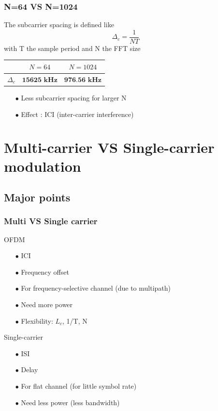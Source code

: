 \documentclass[11pt]{beamer}
\begin{document}
\begin{frame}
\frametitle{N=64 VS N=1024}
The subcarrier spacing is defined like
\begin{equation}
\Delta_c=\frac{1}{NT} 
\end{equation}
with T the sample period and N the FFT size

\begin{center}
	\begin{tabular}{c|c|c}
		  & $N=64$ & $N=1024$\\
		  \hline
	$\Delta_c$ & $\textbf{15625~kHz}$ & $\textbf{976.56 kHz}$ \\
	\end{tabular}
	\label{tab3}
\end{center}

\begin{itemize}

\item[$\bullet$] Less subcarrier spacing for larger N
\item[$\bullet$] Effect : ICI (inter-carrier interference)
\end{itemize}

\end{frame}

\section{Multi-carrier VS Single-carrier modulation}

\subsection{Major points}
\begin{frame}
\frametitle{Multi VS Single carrier}
\begin{minipage}[t]{0.48\linewidth}
OFDM
\begin{itemize}
\item[$\bullet$] {\color{red} ICI}
\item[$\bullet$] {\color{red} Frequency offset}
\item[$\bullet$] For frequency-selective channel (due to multipath)
\item[$\bullet$] Need more power
\item[$\bullet$] Flexibility: $L_c$, 1/T, N


\end{itemize}
\end{minipage}\hfill
\begin{minipage}[t]{0.48\linewidth}
Single-carrier
\begin{itemize}
\item[$\bullet$] {\color{red} ISI}
\item[$\bullet$] {\color{red} Delay} 
\item[$\bullet$] For flat channel (for little symbol rate)
\item[$\bullet$] Need less power (less bandwidth) 

\end{itemize}

\end{minipage}

\end{frame}
\end{document}
